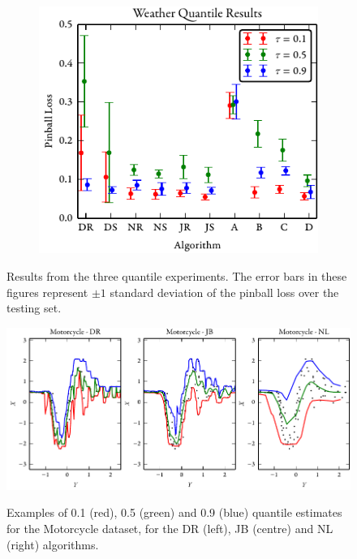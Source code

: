 \documentclass[twoside]{article} \usepackage{aistats2017}
\theoremstyle{definition}
\begin{document}
\begin{figure}[!htbp]
\begin{subfigure}[b]{0.32\textwidth}
			\end{subfigure}
			\begin{subfigure}[b]{0.32\textwidth}
				\includegraphics[width=\textwidth]{figures/Weather_results}
			\end{subfigure}
			\caption{Results from the three quantile experiments. The error bars in these
				figures represent $\pm 1$ standard deviation of the pinball loss over the testing set.}
			\label{fig:qfull}
		\end{figure}

		\begin{figure}[!htbp]
			\begin{center}
				\includegraphics[width=\columnwidth]{figures/mcquantilesall}\\
			\end{center}
			\caption{Examples of 0.1 (red), 0.5 (green) and 0.9 (blue) quantile estimates
				for the Motorcycle dataset, for the DR (left), JB (centre) and NL (right) algorithms.}
			\label{fig:motorcycleresults} 
		\end{figure}
		
\end{document}
